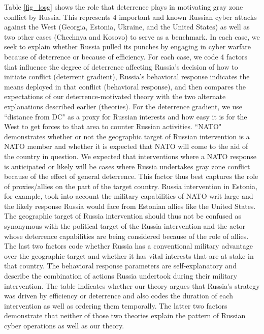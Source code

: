 \documentclass[12pt,letterpaper]{article}
\begin{document}
	Table \ref{fig_losg} shows the role that deterrence plays in motivating gray zone conflict by Russia. This represents 4 important and known Russian cyber attacks against the West (Georgia, Estonia, Ukraine, and the United States) as well as two other cases (Chechnya and Kosovo) to serve as a benchmark. In each case, we seek to explain whether Russia pulled its punches by engaging in cyber warfare because of deterrence or because of efficiency. For each case, we code 4 factors that influence the degree of deterrence affecting Russia's decision of how to initiate conflict (deterrent gradient), Russia's behavioral response indicates the means deployed in that conflict (behavioral response), and then compares the expectations of our deterrence-motivated theory with the two alternate explanations described earlier (theories). For the deterrence gradient, we use ``distance from DC" as a proxy for Russian interests and how easy it is for the West to get forces to that area to counter Russian activities. ``NATO" demonstrates whether or not the geographic target of Russian intervention is a NATO member and whether it is expected that NATO will come to the aid of the country in question. We expected that interventions where a NATO response is anticipated or likely will be cases where Russia undertakes gray zone conflict because of the effect of general deterrence. This factor thus best captures the role of proxies/allies on the part of the target country. Russia intervention in Estonia, for example, took into account the military capabilities of NATO writ large and the likely response Russia would face from Estonian allies like the United States. The geographic target of Russia intervention should thus not be confused as synonymous with the political target of the Russia intervention and the actor whose deterrence capabilities are being considered because of the role of allies. The last two factors code whether Russia has a conventional military advantage over the geographic target and whether it has vital interests that are at stake in that country. The behavioral response parameters are self-explanatory and describe the combination of actions Russia undertook during their military intervention. The table indicates whether our theory argues that Russia's strategy was driven by efficiency or deterrence and also codes the duration of each intervention as well as ordering them temporally. The latter two factors demonstrate that neither of those two theories explain the pattern of Russian cyber operations as well as our theory.
\end{document}
